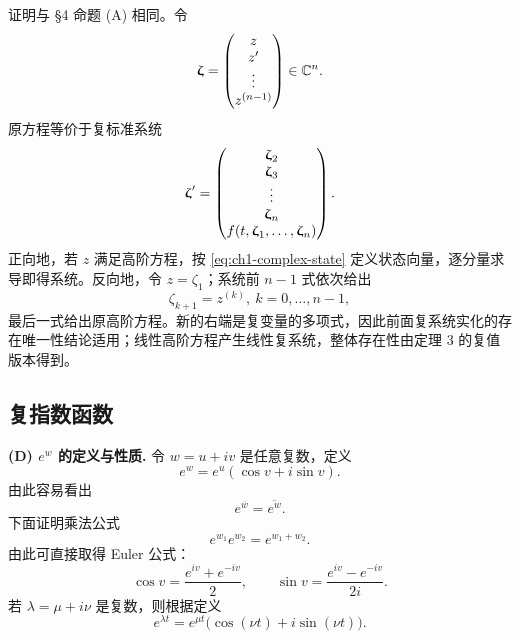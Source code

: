 证明与 §4 命题 (A) 相同。令
\begin{equation}
 \vect{\zeta}=
 \begin{pmatrix}
  z\\z'\\\vdots\\z^{(n-1)}
 \end{pmatrix}
 \in\C^n.
 \label{eq:ch1-complex-state}
\end{equation}
原方程等价于复标准系统
\begin{equation}
 \vect{\zeta}'=
 \begin{pmatrix}
  \zeta_2\\
  \zeta_3\\
  \vdots\\
  \zeta_n\\
  f(t,\zeta_1,\ldots,\zeta_n)
 \end{pmatrix}.
 \label{eq:ch1-complex-companion}
\end{equation}
正向地，若 \(z\) 满足高阶方程，按 \eqref{eq:ch1-complex-state} 定义状态向量，逐分量求导即得系统。反向地，令 \(z=\zeta_1\)；系统前 \(n-1\) 式依次给出
\[
 \zeta_{k+1}=z^{(k)},
 \ k=0,\ldots,n-1,
\]
最后一式给出原高阶方程。新的右端是复变量的多项式，因此前面复系统实化的存在唯一性结论适用；线性高阶方程产生线性复系统，整体存在性由定理 3 的复值版本得到。

\subsection{复指数函数}

\textbf{(D) \(e^w\) 的定义与性质.} 令 \(w=u+iv\) 是任意复数，定义
\begin{equation}
 e^w=e^u(\cos v+i\sin v).
 \label{eq:ch1-complex-exponential-definition}
\end{equation}
由此容易看出
\begin{equation}
 e^{\overline w}=\overline{e^w}.
 \label{eq:ch1-complex-conjugate-exponential}
\end{equation}
下面证明乘法公式
\begin{equation}
 e^{w_1}e^{w_2}=e^{w_1+w_2}.
 \label{eq:ch1-complex-exponential-product}
\end{equation}
由此可直接取得 Euler 公式：
\begin{equation}
 \cos v=\frac{e^{iv}+e^{-iv}}2,
 \qquad
 \sin v=\frac{e^{iv}-e^{-iv}}{2i}.
 \label{eq:ch1-euler-formulas}
\end{equation}
若 \(\lambda=\mu+i\nu\) 是复数，则根据定义
\begin{equation}
 e^{\lambda t}
 =e^{\mu t}
 \bigl(\cos(\nu t)+i\sin(\nu t)\bigr).
 \label{eq:ch1-exponential-real-time}
\end{equation}

